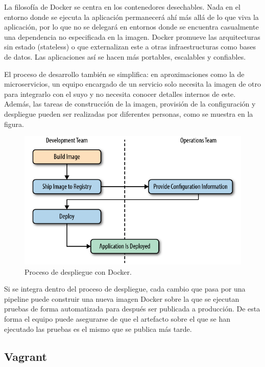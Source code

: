 \documentclass[11pt,spanish,listoffigures]{tfgetsinf}
\begin{document}
La filosofía de Docker se centra en los contenedores desechables. Nada en el entorno donde se ejecuta la aplicación permanecerá ahí más allá de lo que viva la aplicación, por lo que no se delegará en entornos donde se encuentra casualmente una dependencia no especificada en la imagen. Docker promueve las arquitecturas sin estado (stateless) o que externalizan este a otras infraestructuras como bases de datos. Las aplicaciones así se hacen más portables, escalables y confiables. \cite{Matthias}

El proceso de desarrollo también se simplifica: en aproximaciones como la de microservicios, un equipo encargado de un servicio solo necesita la imagen de otro para integrarlo con el suyo y no necesita conocer detalles internos de este. Además, las tareas de construcción de la imagen, provisión de la configuración y despliegue pueden ser realizadas por diferentes personas, como se muestra en la figura. 

\begin{figure}[h]
\centering
\includegraphics[scale=0.7]{docker_process}
\caption{Proceso de despliegue con Docker. \cite{Matthias}}
\end{figure}


Si se integra dentro del proceso de despliegue, cada cambio que pasa por una pipeline puede construir una nueva imagen Docker sobre la que se ejecutan pruebas de forma automatizada para después ser publicada a producción. De esta forma el equipo puede asegurarse de que el artefacto sobre el que se han ejecutado las pruebas es el mismo que se publica más tarde. 

\subsection{Vagrant}
\end{document}
